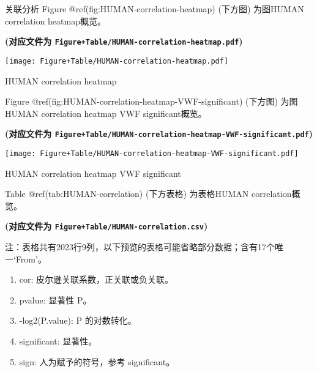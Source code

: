 \documentclass[
  ignorenonframetext,
]{beamer}
\providecommand{\tightlist}{%
  \setlength{\itemsep}{0pt}\setlength{\parskip}{0pt}}
\begin{document}
\begin{frame}[fragile]{关联分析}
\protect\hypertarget{ux5173ux8054ux5206ux6790}{}
Figure @ref(fig:HUMAN-correlation-heatmap) (下方图) 为图HUMAN
correlation heatmap概览。

\textbf{(对应文件为
\texttt{Figure+Table/HUMAN-correlation-heatmap.pdf})}

\def\@captype{figure}
\begin{center}
\texttt{[image: Figure+Table/HUMAN-correlation-heatmap.pdf]}
\caption{HUMAN correlation heatmap}\label{fig:HUMAN-correlation-heatmap}
\end{center}

Figure @ref(fig:HUMAN-correlation-heatmap-VWF-significant) (下方图)
为图HUMAN correlation heatmap VWF significant概览。

\textbf{(对应文件为
\texttt{Figure+Table/HUMAN-correlation-heatmap-VWF-significant.pdf})}

\def\@captype{figure}
\begin{center}
\texttt{[image: Figure+Table/HUMAN-correlation-heatmap-VWF-significant.pdf]}
\caption{HUMAN correlation heatmap VWF significant}\label{fig:HUMAN-correlation-heatmap-VWF-significant}
\end{center}

Table @ref(tab:HUMAN-correlation) (下方表格) 为表格HUMAN
correlation概览。

\textbf{(对应文件为 \texttt{Figure+Table/HUMAN-correlation.csv})}

\begin{center}\begin{tcolorbox}[colback=gray!10, colframe=gray!50, width=0.9\linewidth, arc=1mm, boxrule=0.5pt]注：表格共有2023行9列，以下预览的表格可能省略部分数据；含有17个唯一`From'。
\end{tcolorbox}
\end{center}
\begin{center}\begin{tcolorbox}[colback=gray!10, colframe=gray!50, width=0.9\linewidth, arc=1mm, boxrule=0.5pt]\begin{enumerate}\tightlist
\item cor:  皮尔逊关联系数，正关联或负关联。
\item pvalue:  显著性 P。
\item -log2(P.value):  P 的对数转化。
\item significant:  显著性。
\item sign:  人为赋予的符号，参考 significant。
\end{enumerate}\end{tcolorbox}
\end{center}


\end{frame}
\end{document}
